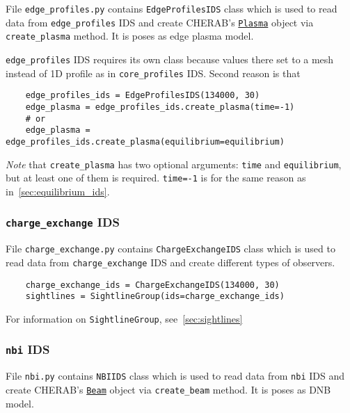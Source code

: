 \documentclass[../main.tex]{subfiles}
\begin{document}
File \texttt{edge\_profiles.py} contains \texttt{EdgeProfilesIDS} class which is used to read data from \texttt{edge\_profiles} IDS and create CHERAB's \href{https://cherab.github.io/documentation/plasmas/core_plasma_classes.html?highlight=plasma#cherab.core.Plasma}{\texttt{Plasma}} object via \texttt{create\_plasma} method. It is poses as edge plasma model.

\texttt{edge\_profiles} IDS requires its own class because values there set to a mesh instead of 1D profile as in \texttt{core\_profiles} IDS. Second reason is that

\begin{verbatim}
    edge_profiles_ids = EdgeProfilesIDS(134000, 30)
    edge_plasma = edge_profiles_ids.create_plasma(time=-1)
    # or
    edge_plasma = edge_profiles_ids.create_plasma(equilibrium=equilibrium)
\end{verbatim}
\emph{Note} that \texttt{create\_plasma} has two optional arguments: \texttt{time} and \texttt{equilibrium}, but at least one of them is required. \texttt{time=-1} is for the same reason as in~\cref{sec:equilibrium_ids}.

\subsubsection{\texttt{charge\_exchange} IDS}%
\label{sec:charge_exchange_ids}

File \texttt{charge\_exchange.py} contains \texttt{ChargeExchangeIDS} class which is used to read data from \texttt{charge\_exchange} IDS and create different types of observers.

\begin{verbatim}
    charge_exchange_ids = ChargeExchangeIDS(134000, 30)
    sightlines = SightlineGroup(ids=charge_exchange_ids)
\end{verbatim}

For information on \texttt{SightlineGroup}, see~\cref{sec:sightlines}

\subsubsection{\texttt{nbi} IDS}%
\label{sec:nbi_ids}

File \texttt{nbi.py} contains \texttt{NBIIDS} class which is used to read data from \texttt{nbi} IDS and create CHERAB's \href{https://cherab.github.io/documentation/plasmas/particle_beams.html?highlight=beam#cherab.core.Beam}{\texttt{Beam}} object via \texttt{create\_beam} method. It is poses as DNB model.
\end{document}
